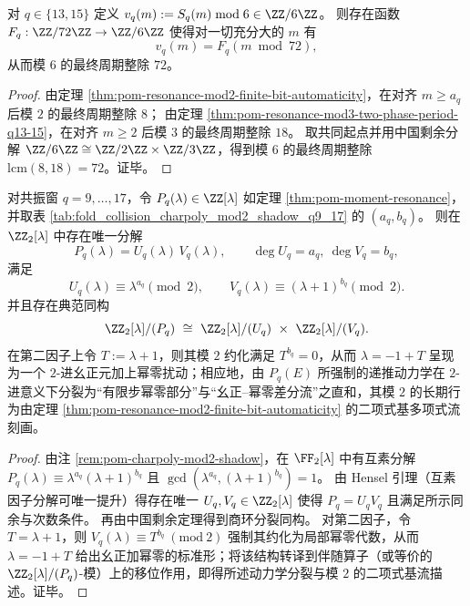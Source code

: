 \begin{theorem}\label{thm:pom-resonance-mod6-period-q13-15}
对 \(q\in\{13,15\}\) 定义 \(v_q(m):=S_q(m)\bmod 6\in\ZZ/6\ZZ\)。
则存在函数 \(F_q:\ZZ/72\ZZ\to\ZZ/6\ZZ\) 使得对一切充分大的 \(m\) 有
\[
v_q(m)=F_q(m\bmod 72),
\]
从而模 \(6\) 的最终周期整除 \(72\)。
\end{theorem}
\begin{proof}
由定理 \ref{thm:pom-resonance-mod2-finite-bit-automaticity}，在对齐 \(m\ge a_q\) 后模 \(2\) 的最终周期整除 \(8\)；
由定理 \ref{thm:pom-resonance-mod3-two-phase-period-q13-15}，在对齐 \(m\ge 2\) 后模 \(3\) 的最终周期整除 \(18\)。
取共同起点并用中国剩余分解 \(\ZZ/6\ZZ\cong\ZZ/2\ZZ\times\ZZ/3\ZZ\)，得到模 \(6\) 的最终周期整除 \(\mathrm{lcm}(8,18)=72\)。证毕。
\end{proof}

\begin{theorem}\label{thm:pom-resonance-hensel-splitting-z2}
对共振窗 \(q=9,\dots,17\)，令 \(P_q(\lambda)\in\ZZ[\lambda]\) 如定理 \ref{thm:pom-moment-resonance}，并取表 \ref{tab:fold_collision_charpoly_mod2_shadow_q9_17} 的 \((a_q,b_q)\)。
则在 \(\ZZ_2[\lambda]\) 中存在唯一分解
\[
P_q(\lambda)=U_q(\lambda)\,V_q(\lambda),
\qquad \deg U_q=a_q,\ \deg V_q=b_q,
\]
满足
\[
U_q(\lambda)\equiv \lambda^{a_q}\pmod 2,\qquad V_q(\lambda)\equiv (\lambda+1)^{b_q}\pmod 2.
\]
并且存在典范同构
\[
\ZZ_2[\lambda]/(P_q)\ \cong\ \ZZ_2[\lambda]/(U_q)\ \times\ \ZZ_2[\lambda]/(V_q).
\]
在第二因子上令 \(T:=\lambda+1\)，则其模 \(2\) 约化满足 \(T^{b_q}=0\)，从而 \(\lambda=-1+T\) 呈现为一个 \(2\)-进幺正元加上幂零扰动；相应地，由 \(P_q(E)\) 所强制的递推动力学在 \(2\)-进意义下分裂为“有限步幂零部分”与“幺正--幂零差分流”之直和，其模 \(2\) 的长期行为由定理 \ref{thm:pom-resonance-mod2-finite-bit-automaticity} 的二项式基多项式流刻画。
\end{theorem}
\begin{proof}
由注 \ref{rem:pom-charpoly-mod2-shadow}，在 \(\FF_2[\lambda]\) 中有互素分解
\(
P_q(\lambda)\equiv \lambda^{a_q}(\lambda+1)^{b_q}
\)
且 \(\gcd(\lambda^{a_q},(\lambda+1)^{b_q})=1\)。
由 Hensel 引理（互素因子分解可唯一提升）得存在唯一 \(U_q,V_q\in\ZZ_2[\lambda]\) 使得 \(P_q=U_qV_q\) 且满足所示同余与次数条件。
再由中国剩余定理得到商环分裂同构。
对第二因子，令 \(T=\lambda+1\)，则 \(V_q(\lambda)\equiv T^{b_q}\ (\mathrm{mod}\ 2)\) 强制其约化为局部幂零代数，从而 \(\lambda=-1+T\) 给出幺正加幂零的标准形；将该结构转译到伴随算子（或等价的 \(\ZZ_2[\lambda]/(P_q)\)-模）上的移位作用，即得所述动力学分裂与模 \(2\) 的二项式基流描述。证毕。
\end{proof}

\endinput
